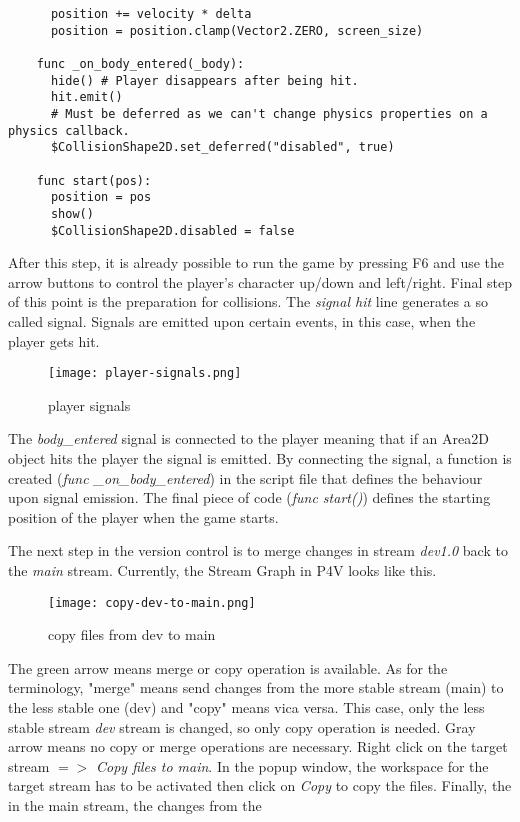 \begin{enumerate}[resume]
\begin{verbatim}
      position += velocity * delta
      position = position.clamp(Vector2.ZERO, screen_size)  
      
    func _on_body_entered(_body):
      hide() # Player disappears after being hit.
      hit.emit()
      # Must be deferred as we can't change physics properties on a physics callback.
      $CollisionShape2D.set_deferred("disabled", true)
      
    func start(pos):
      position = pos
      show()
      $CollisionShape2D.disabled = false
  \end{verbatim} 
  After this step, it is already possible to run the game by pressing F6 and use the arrow buttons to control the player's
  character up/down and left/right.
  Final step of this point is the preparation for collisions. The \textit{signal hit} line generates a so called signal.
  Signals are emitted upon certain events, in this case, when the player gets hit.
  \begin{figure}[H]
    \centering
    \texttt{[image: player-signals.png]}
      \caption{player signals}
      \label{fig:player-signals}
  \end{figure}
  The \textit{body\_entered} signal is connected to the player meaning that if an Area2D object hits the player the signal
  is emitted. By connecting the signal, a function is created (\textit{func \_on\_body\_entered}) in the script file that defines the behaviour upon signal
  emission. The final piece of code (\textit{func start()}) defines the starting position of the player when the game starts.
\end{enumerate}
The next step in the version control is to merge changes in stream \textit{dev1.0} back to the \textit{main} stream. Currently,
the Stream Graph in P4V looks like this.
\begin{figure}[H]
  \centering
  \texttt{[image: copy-dev-to-main.png]}
    \caption{copy files from dev to main}
    \label{fig:copy-dev-to-main}
\end{figure}
The green arrow means merge or copy operation is available. As for the terminology, "merge" means send changes from the 
more stable stream (main) to the less stable one (dev) and "copy" means vica versa. This case, only the less stable stream
\textit{dev} stream is changed, so only copy operation is needed. Gray arrow means no copy or merge operations are necessary.
Right click on the target stream {$=>$} \textit{Copy files to main}. In the popup window, the workspace for the target stream
has to be activated then click on \textit{Copy} to copy the files. Finally, the in the main stream, the changes from the 
